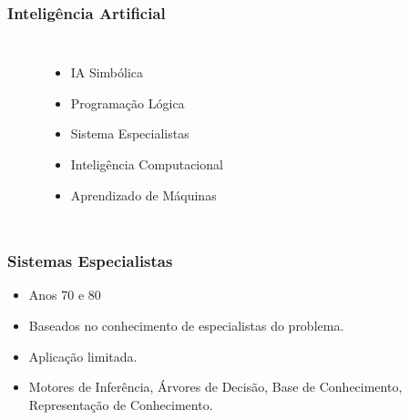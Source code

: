 \documentclass[aspectratio=169,12pt]{beamer}
\begin{document}
{%
\begin{frame}
    \frametitle{Inteligência \hfill\hfill \linebreak Artificial}
\begin{columns}
    \column{\dimexpr 0.6\paperwidth-10pt}
    $\;$
    \column{\dimexpr 0.5\paperwidth-10pt}
   
    \bfseries \begin{itemize}
        \setlength\itemsep{1em}
        \item \color{black} IA Simbólica
        \item Programação Lógica
        \item Sistema Especialistas
        \item Inteligência Computacional
        \item Aprendizado de Máquinas
    \end{itemize}
    
\end{columns}
\end{frame}
}
    
\begin{frame}
    \frametitle{Sistemas Especialistas}
    \begin{itemize}
        \setlength\itemsep{1em}
        \item Anos 70 e 80
        \item Baseados no conhecimento de especialistas do problema.
        \item Aplicação limitada.
        \item Motores de Inferência, Árvores de Decisão, Base de
        Conhecimento, Representação de Conhecimento.
    \end{itemize}
\end{frame}
    
\end{document}
